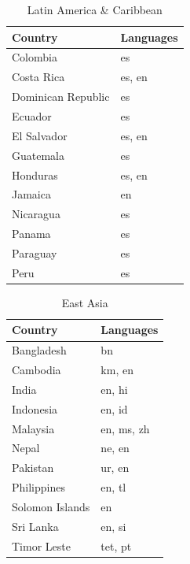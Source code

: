 \documentclass[
  letterpaper,
  DIV=11,
  numbers=noendperiod]{scrartcl}
\begin{document}
\begin{table}[!h]
\centering
\caption{Latin America \& Caribbean}
\centering
\fontsize{10}{12}\selectfont
\begin{tabular}[t]{l|l}
\hline
Country & Languages\\
\hline
Colombia & es\\
Costa Rica & es, en\\
Dominican Republic & es\\
Ecuador & es\\
El Salvador & es, en\\
Guatemala & es\\
Honduras & es, en\\
Jamaica & en\\
Nicaragua & es\\
Panama & es\\
Paraguay & es\\
Peru & es\\
\hline
\end{tabular}
\end{table}

\begin{table}[!h]
\centering
\caption{East Asia}
\centering
\fontsize{10}{12}\selectfont
\begin{tabular}[t]{l|l}
\hline
Country & Languages\\
\hline
Bangladesh & bn\\
Cambodia & km, en\\
India & en, hi\\
Indonesia & en, id\\
Malaysia & en, ms, zh\\
Nepal & ne, en\\
Pakistan & ur, en\\
Philippines & en, tl\\
Solomon Islands & en\\
Sri Lanka & en, si\\
Timor Leste & tet, pt\\
\hline
\end{tabular}
\end{table}
\end{document}
